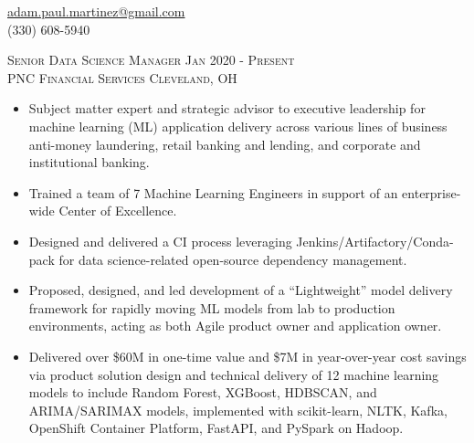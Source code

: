 \documentclass[letterpaper, 10pt]{article} %
\begin{document}
\pagestyle{empty}  %

\topskip 0pt
\vspace*{\fill}  %



\vspace{-0.5em}

\begin{center}
\href{mailto:adam.paul.martinez@gmail.com}{adam.paul.martinez@gmail.com} \\
(330) 608-5940
\end{center}


\justify

\textsc{Senior Data Science Manager \hfill Jan 2020 - Present} \\
\textsc{PNC Financial Services \hfill Cleveland, OH}
\begin{itemize}
 \item Subject matter expert and strategic advisor to executive leadership for machine learning (ML) application delivery across various lines of business \textemdash\hspace{0.00em} anti-money laundering, retail banking and lending, and corporate and institutional banking.
 \item Trained a team of 7 Machine Learning Engineers in support of an enterprise-wide Center of Excellence.
 \item Designed and delivered a CI process leveraging Jenkins/Artifactory/Conda-pack for data science-related open-source dependency management.
 \item Proposed, designed, and led development of a ``Lightweight'' model delivery framework for rapidly moving ML models from lab to production environments, acting as both Agile product owner and application owner.
 \item Delivered over \$60M in one-time value and \$7M in year-over-year cost savings via product solution design and technical delivery of 12 machine learning models to include Random Forest, XGBoost, HDBSCAN, and ARIMA/SARIMAX models, implemented with scikit-learn, NLTK, Kafka, OpenShift Container Platform, FastAPI, and PySpark on Hadoop.
\end{itemize}
\end{document}
